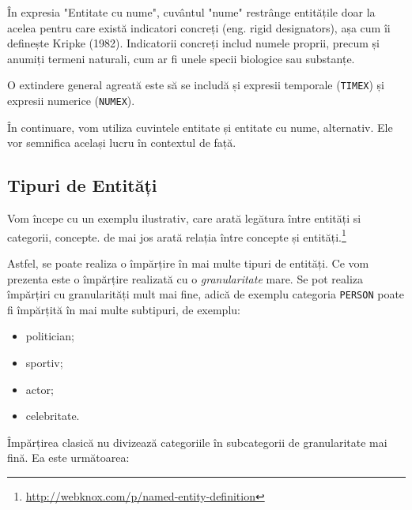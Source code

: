 În expresia "Entitate cu nume", cuvântul "nume" restrânge entitățile doar la acelea pentru care există indicatori concreți (eng. rigid designators), așa cum îi definește Kripke (1982). Indicatorii concreți includ numele proprii, precum și anumiți termeni naturali, cum ar fi unele specii biologice sau substanțe.

O extindere general agreată este să se includă și expresii temporale (\texttt{TIMEX}) și expresii numerice (\texttt{NUMEX}).

În continuare, vom utiliza cuvintele entitate și entitate cu nume, alternativ. Ele vor semnifica același lucru în contextul de față.

\subsection{Tipuri de Entități}

Vom începe cu un exemplu ilustrativ, care arată legătura între entități si categorii, concepte.  de mai jos arată relația între concepte și entități.\footnote{\url{http://webknox.com/p/named-entity-definition}}



Astfel, se poate realiza o împărțire în mai multe tipuri de entități. Ce vom prezenta este o împărțire realizată cu o \textit{granularitate} mare. Se pot realiza împărțiri cu granularități mult mai fine, adică de exemplu categoria \texttt{PERSON} poate fi împărțită în mai multe subtipuri, de exemplu:

\begin{itemize}
\item politician;
\item sportiv;
\item actor;
\item celebritate.
\end{itemize}

Împărțirea clasică nu divizează categoriile în subcategorii de granularitate mai fină. Ea este următoarea:

